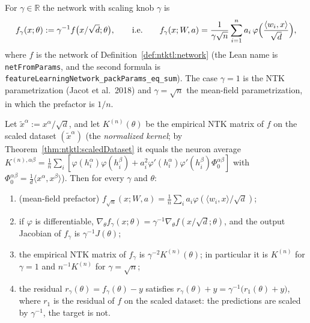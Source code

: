 \begin{definition}\label{def:ntkfl:network}
  \leanok
For $\gamma\in\mathbb R$ the network with scaling knob $\gamma$ is
\[
  f_\gamma(x;\theta):=\gamma^{-1}f\bigl(x/\sqrt d;\theta\bigr),\qquad\text{i.e.}\qquad
  f_\gamma(x;W,a)=\frac1{\gamma\sqrt n}\sum_{i=1}^na_i\,\varphi\Bigl(\frac{\langle w_i,x\rangle}{\sqrt d}\Bigr),
\]
where $f$ is the network of Definition~\ref{def:ntktl:network} (the Lean name is \texttt{netFromParams}, and the second formula is
\texttt{featureLearningNetwork\_packParams\_eq\_sum}). The case $\gamma=1$ is the NTK parametrization (Jacot et al.\ 2018)
and $\gamma=\sqrt n$ the mean-field parametrization, in which the prefactor is $1/n$.
\end{definition}

\begin{lemma}\label{lem:ntkfl:gammaNTK}
  \leanok
Let $\tilde x^\alpha:=x^\alpha/\sqrt d$, and let $K^{(n)}(\theta)$ be the empirical NTK matrix of $f$ on the scaled dataset $(\tilde x^\alpha)$
(the \emph{normalized kernel}; by Theorem~\ref{thm:ntktl:scaledDataset} it equals the neuron average
$K^{(n),\alpha\beta}=\frac1n\sum_i[\varphi(h_i^\alpha)\varphi(h_i^\beta)+a_i^2\varphi'(h_i^\alpha)\varphi'(h_i^\beta)\Phi_0^{\alpha\beta}]$ with
$\Phi_0^{\alpha\beta}=\frac1d\langle x^\alpha,x^\beta\rangle$). Then for every $\gamma$ and $\theta$:
\begin{enumerate}
  \item (mean-field prefactor) $f_{\sqrt n}(x;W,a)=\frac1n\sum_ia_i\varphi(\langle w_i,x\rangle/\sqrt d)$;
  \item if $\varphi$ is differentiable, $\nabla_\theta f_\gamma(x;\theta)=\gamma^{-1}\nabla_\theta f(x/\sqrt d;\theta)$, and the output Jacobian of $f_\gamma$
        is $\gamma^{-1}J(\theta)$;
  \item the empirical NTK matrix of $f_\gamma$ is $\gamma^{-2}K^{(n)}(\theta)$; in particular it is $K^{(n)}$ for $\gamma=1$ and $n^{-1}K^{(n)}$ for $\gamma=\sqrt n$;
  \item the residual $r_\gamma(\theta)=f_\gamma(\theta)-y$ satisfies $r_\gamma(\theta)+y=\gamma^{-1}\bigl(r_1(\theta)+y\bigr)$, where $r_1$ is the residual of $f$ on the scaled dataset:
        the predictions are scaled by $\gamma^{-1}$, the target is not.
\end{enumerate}
\end{lemma}

